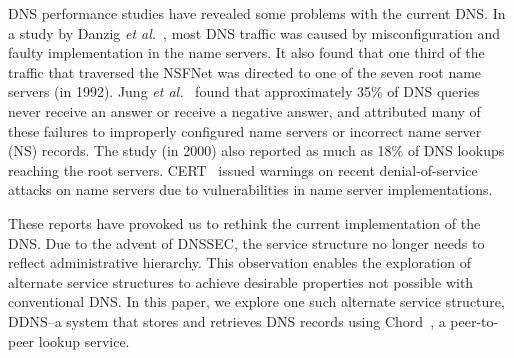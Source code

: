 DNS performance studies have revealed some problems with the
current DNS. In a study by Danzig {\it et al.}~\cite{dnsroot:sigcomm92},
most DNS traffic was caused by misconfiguration and faulty implementation
in the name servers. It also found that one third of the 
traffic that traversed the NSFNet was directed to one of 
the seven root name servers (in 1992). 
Jung {\it et al.}~\cite{dnscache:sigcommimw01}
found that approximately 35\% of DNS queries never receive
an answer or receive a negative answer, and attributed
many of these failures to 
improperly configured name servers or incorrect name server (NS) records.
The study (in 2000) also reported as much as 18\% of DNS lookups 
reaching the root servers. 
CERT~\cite{cert} issued warnings on recent 
denial-of-service attacks on name 
servers due to vulnerabilities in name server implementations.

These reports have provoked us to rethink the current 
implementation of the DNS. 
Due to the advent of DNSSEC, the service structure no longer needs
to reflect administrative hierarchy. 
This observation enables the exploration of alternate service 
structures to achieve desirable properties not possible
with conventional DNS.  In this paper, we explore one such
alternate service structure, DDNS--a system that stores and retrieves
DNS records using Chord~\cite{chord:sigcomm}, a peer-to-peer
lookup service.

